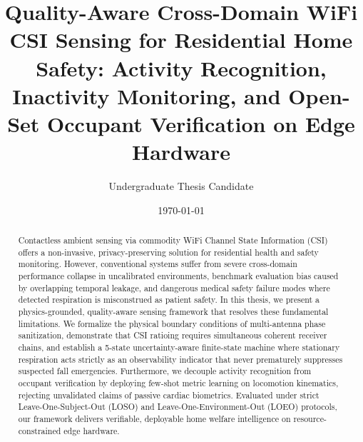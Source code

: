 \documentclass[12pt,a4paper]{report}
\title{Quality-Aware Cross-Domain WiFi CSI Sensing for Residential Home Safety: Activity Recognition, Inactivity Monitoring, and Open-Set Occupant Verification on Edge Hardware}
\author{Undergraduate Thesis Candidate}
\date{\today}
\begin{document}
\maketitle

\begin{abstract}
Contactless ambient sensing via commodity WiFi Channel State Information (CSI) offers a non-invasive, privacy-preserving solution for residential health and safety monitoring. However, conventional systems suffer from severe cross-domain performance collapse in uncalibrated environments, benchmark evaluation bias caused by overlapping temporal leakage, and dangerous medical safety failure modes where detected respiration is misconstrued as patient safety. In this thesis, we present a physics-grounded, quality-aware sensing framework that resolves these fundamental limitations. We formalize the physical boundary conditions of multi-antenna phase sanitization, demonstrate that CSI ratioing requires simultaneous coherent receiver chains, and establish a 5-state uncertainty-aware finite-state machine where stationary respiration acts strictly as an observability indicator that never prematurely suppresses suspected fall emergencies. Furthermore, we decouple activity recognition from occupant verification by deploying few-shot metric learning on locomotion kinematics, rejecting unvalidated claims of passive cardiac biometrics. Evaluated under strict Leave-One-Subject-Out (LOSO) and Leave-One-Environment-Out (LOEO) protocols, our framework delivers verifiable, deployable home welfare intelligence on resource-constrained edge hardware.
\end{abstract}

\tableofcontents







\printbibliography
\end{document}

